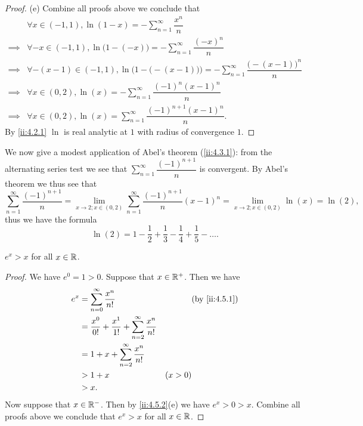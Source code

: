 \begin{proof}{(e)}
  Combine all proofs above we conclude that
  \begin{align*}
             & \forall x \in (-1, 1), \ln(1 - x) = - \sum_{n = 1}^\infty \dfrac{x^n}{n}                                                  \\
    \implies & \forall -x \in (-1, 1), \ln\big(1 - (-x)\big) = - \sum_{n = 1}^\infty \dfrac{(-x)^n}{n}                                   \\
    \implies & \forall -(x - 1) \in (-1, 1), \ln\Big(1 - \big(-(x - 1)\big)\Big) = - \sum_{n = 1}^\infty \dfrac{\big(-(x - 1)\big)^n}{n} \\
    \implies & \forall x \in (0, 2), \ln(x) = - \sum_{n = 1}^\infty \dfrac{(-1)^n (x - 1)^n}{n}                                          \\
    \implies & \forall x \in (0, 2), \ln(x) = \sum_{n = 1}^\infty \dfrac{(-1)^{n + 1} (x - 1)^n}{n}.
  \end{align*}
  By \cref{ii:4.2.1} \(\ln\) is real analytic at \(1\) with radius of convergence \(1\).
\end{proof}

\begin{eg}\label{ii:4.5.7}
  We now give a modest application of Abel's theorem (\cref{ii:4.3.1}):
  from the alternating series test we see that \(\sum_{n = 1}^\infty \dfrac{(-1)^{n + 1}}{n}\) is convergent.
  By Abel's theorem we thus see that
  \[
    \sum_{n = 1}^\infty \dfrac{(-1)^{n + 1}}{n} = \lim_{x \to 2 ; x \in (0, 2)} \sum_{n = 1}^\infty \dfrac{(-1)^{n + 1}}{n} (x - 1)^n = \lim_{x \to 2 ; x \in (0, 2)} \ln(x) = \ln(2),
  \]
  thus we have the formula
  \[
    \ln(2) = 1 - \dfrac{1}{2} + \dfrac{1}{3} - \dfrac{1}{4} +\dfrac{1}{5} - \dots.
  \]
\end{eg}

\begin{ac}\label{ii:ac:4.5.1}
  \(e^x > x\) for all \(x \in \mathbb{R}\).
\end{ac}

\begin{proof}
  We have \(e^0 = 1 > 0\).
  Suppose that \(x \in \mathbb{R}^+\).
  Then we have
  \begin{align*}
    e^x & = \sum_{n = 0}^\infty \dfrac{x^n}{n!}                                     &         & \by{ii:4.5.1} \\
        & = \dfrac{x^0}{0!} + \dfrac{x^1}{1!} + \sum_{n = 2}^\infty \dfrac{x^n}{n!}                           \\
        & = 1 + x + \sum_{n = 2}^\infty \dfrac{x^n}{n!}                                                       \\
        & > 1 + x                                                                   & (x > 0)                 \\
        & > x.
  \end{align*}
  Now suppose that \(x \in \mathbb{R}^-\).
  Then by \cref{ii:4.5.2}(e) we have \(e^x > 0 > x\).
  Combine all proofs above we conclude that \(e^x > x\) for all \(x \in \mathbb{R}\).
\end{proof}

